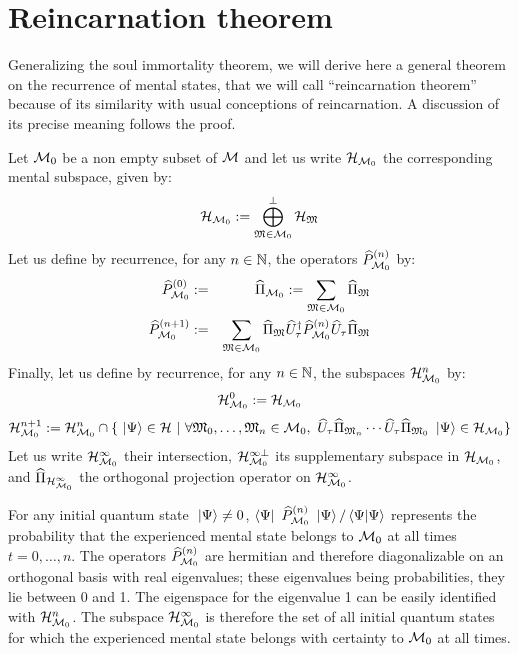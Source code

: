 \section{Reincarnation theorem}

Generalizing the soul immortality theorem, we will derive here a general theorem on the recurrence of mental states, that we will call ``reincarnation theorem'' because of its similarity with usual conceptions of reincarnation. A discussion of its precise meaning follows the proof.

 Let $\mathcal M_0$ be a non empty subset of $\mathcal M$ and let us write $\mathcal H_{\mathcal M_0}$ the corresponding mental subspace, given by:
\begin{equation*}
\mathcal H_{\mathcal M_0} := \bigoplus_{\mathfrak{M} \in \mathcal M_0}^\perp \mathcal H_{\mathfrak{M}}
\end{equation*}
Let us define by recurrence, for any $n \in \mathbb{N}$, the operators $\widehat{P}_{\mathcal M_0}^{(n)}$ by:
\begin{eqnarray*}
\widehat{P}_{\mathcal M_0}^{(0)} & := & \widehat{\Pi}_{\mathcal M_0} := \sum_{\mathfrak{M} \in \mathcal M_0} \widehat{\Pi}_{\mathfrak{M}} \\
\widehat{P}_{\mathcal M_0}^{(n+1)} & := & \sum_{\mathfrak{M} \in \mathcal M_0} \widehat{\Pi}_{\mathfrak{M}} \widehat{U}^{\dagger}_\tau \widehat{P}_{\mathcal M_0}^{(n)} \widehat{U}_\tau \widehat{\Pi}_{\mathfrak{M}}
\end{eqnarray*}
Finally, let us define by recurrence, for any $n \in \mathbb{N}$, the subspaces $\mathcal H_{\mathcal M_0}^n$ by:
\begin{equation*}
\mathcal H_{\mathcal M_0}^0 := \mathcal H_{\mathcal M_0}
\end{equation*}
\begin{equation*}
\mathcal H_{\mathcal M_0}^{n+1} := \mathcal H_{\mathcal M_0}^n \cap \{ \ \left|{\Psi}\right\rangle \in \mathcal H\ |\ \forall \mathfrak{M}_0, \dotsc, \mathfrak{M}_n \in \mathcal M_0,\ \widehat{U}_\tau \widehat{\Pi}_{\mathfrak{M}_n} \dotsm \widehat{U}_\tau \widehat{\Pi}_{\mathfrak{M}_0} \ \left|{\Psi}\right\rangle \in \mathcal H_{\mathcal M_0} \}
\end{equation*}
Let us write $\mathcal H_{\mathcal M_0}^\infty$ their intersection, $\mathcal H_{\mathcal M_0}^{\infty \perp}$ its supplementary subspace in $\mathcal H_{\mathcal M_0}$, and $\widehat{\Pi}_{\mathcal H_{\mathcal M_0}^\infty}$ the orthogonal projection operator on $\mathcal H_{\mathcal M_0}^\infty$.

 For any initial quantum state $\ \left|{\Psi}\right\rangle \neq 0$, $\left\langle{\Psi}\right|\  \widehat{P}_{\mathcal M_0}^{(n)} \ \left|{\Psi}\right\rangle / \left\langle{\Psi}|{\Psi}\right\rangle$ represents the probability that the experienced mental state belongs to $\mathcal M_0$ at all times $t = 0, \dotsc, n$. The operators $\widehat{P}_{\mathcal M_0}^{(n)}$ are hermitian and therefore diagonalizable on an orthogonal basis with real eigenvalues; these eigenvalues being probabilities, they lie between 0 and 1. The eigenspace for the eigenvalue 1 can be easily identified with $\mathcal H_{\mathcal M_0}^n$. The subspace $\mathcal H_{\mathcal M_0}^\infty$ is therefore the set of all initial quantum states for which the experienced mental state belongs with certainty to $\mathcal M_0$ at all times.

